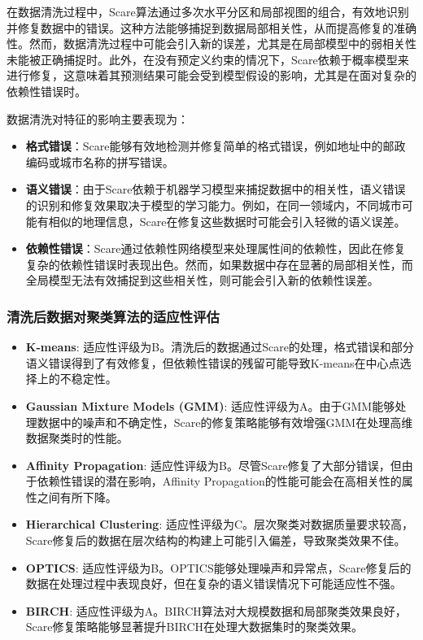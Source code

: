 \documentclass{ctexart} %
\begin{document}
在数据清洗过程中，Scare算法通过多次水平分区和局部视图的组合，有效地识别并修复数据中的错误。这种方法能够捕捉到数据局部相关性，从而提高修复的准确性。然而，数据清洗过程中可能会引入新的误差，尤其是在局部模型中的弱相关性未能被正确捕捉时。此外，在没有预定义约束的情况下，Scare依赖于概率模型来进行修复，这意味着其预测结果可能会受到模型假设的影响，尤其是在面对复杂的依赖性错误时。

数据清洗对特征的影响主要表现为：

\begin{itemize}
    \item \textbf{格式错误}：Scare能够有效地检测并修复简单的格式错误，例如地址中的邮政编码或城市名称的拼写错误。
    \item \textbf{语义错误}：由于Scare依赖于机器学习模型来捕捉数据中的相关性，语义错误的识别和修复效果取决于模型的学习能力。例如，在同一领域内，不同城市可能有相似的地理信息，Scare在修复这些数据时可能会引入轻微的语义误差。
    \item \textbf{依赖性错误}：Scare通过依赖性网络模型来处理属性间的依赖性，因此在修复复杂的依赖性错误时表现出色。然而，如果数据中存在显著的局部相关性，而全局模型无法有效捕捉到这些相关性，则可能会引入新的依赖性误差。
\end{itemize}

\subsubsection{清洗后数据对聚类算法的适应性评估}
\begin{itemize}
    \item \textbf{K-means}: 适应性评级为B。清洗后的数据通过Scare的处理，格式错误和部分语义错误得到了有效修复，但依赖性错误的残留可能导致K-means在中心点选择上的不稳定性。
    \item \textbf{Gaussian Mixture Models (GMM)}: 适应性评级为A。由于GMM能够处理数据中的噪声和不确定性，Scare的修复策略能够有效增强GMM在处理高维数据聚类时的性能。
    \item \textbf{Affinity Propagation}: 适应性评级为B。尽管Scare修复了大部分错误，但由于依赖性错误的潜在影响，Affinity Propagation的性能可能会在高相关性的属性之间有所下降。
    \item \textbf{Hierarchical Clustering}: 适应性评级为C。层次聚类对数据质量要求较高，Scare修复后的数据在层次结构的构建上可能引入偏差，导致聚类效果不佳。
    \item \textbf{OPTICS}: 适应性评级为B。OPTICS能够处理噪声和异常点，Scare修复后的数据在处理过程中表现良好，但在复杂的语义错误情况下可能适应性不强。
    \item \textbf{BIRCH}: 适应性评级为A。BIRCH算法对大规模数据和局部聚类效果良好，Scare修复策略能够显著提升BIRCH在处理大数据集时的聚类效果。
\end{itemize}
\end{document}
